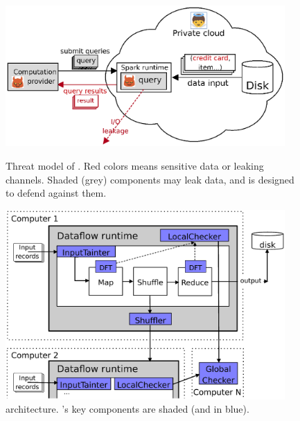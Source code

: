 \begin{figure}[h]
    \centering
    \begin{minipage}{.48\textwidth}    
          \vspace{-.1in}
        \includegraphics[width=0.95\textwidth]{figures/threat_private.ps}
         \vspace{-.1in}         
        \caption{Threat model of \kakute. Red colors means sensitive data or 
leaking channels. Shaded (grey) components may leak data, and \kakute is 
designed to defend against them.}
        \label{fig:falcon-arch}
    \end{minipage}
    \hspace{.1in}
    \centering
    \begin{minipage}{0.48\textwidth}
         \vspace{-.1in}
        \includegraphics[width=0.95\textwidth]{figures/kakute_arch.ps}
         \vspace{-.4in}
        \caption{\kakute architecture. \kakute's key components are shaded 
(and in blue).}
        \label{fig:falcon-protocol}
    \end{minipage}
\end{figure}

